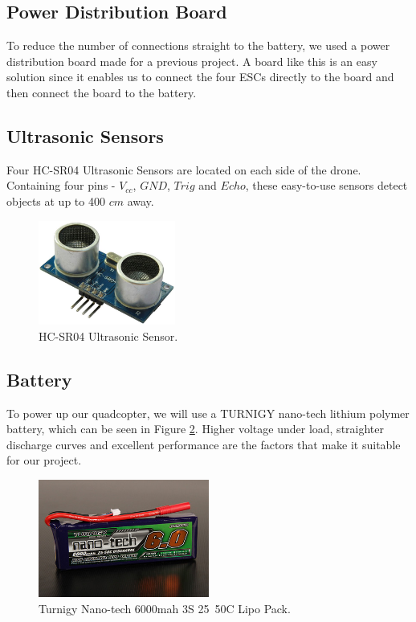 \subsection{Power Distribution Board}
To reduce the number of connections straight to the battery, we used a power distribution board made for a previous project. A board like this is an easy solution since it enables us to connect the four ESCs directly to the board and then connect the board to the battery.

\subsection{Ultrasonic Sensors}
Four HC-SR04 Ultrasonic Sensors are located on each side of the drone. Containing four pins - $V_{cc}$, $GND$, $Trig$ and $Echo$, these easy-to-use sensors detect objects at up to 400 $cm$ away.
\begin{figure}[H]
  \centering
    \includegraphics[width=0.4\textwidth]{images/HCSR04.jpg}
	\caption{HC-SR04 Ultrasonic Sensor.\cite{UltrasonicFig}}
	\label{HC}
\end{figure}

\subsection{Battery}
To power up our quadcopter, we will use a TURNIGY nano-tech lithium polymer battery, which can be seen in Figure \ref{battery}. Higher voltage under load, straighter discharge curves and excellent performance are the factors that make it suitable for our project. 

\begin{figure}[H]
  \centering
    \includegraphics[width=0.5\textwidth]{images/battery.jpg}
	\caption{Turnigy Nano-tech 6000mah 3S 25~50C Lipo Pack.\cite{batteryFig}}
	\label{battery}
\end{figure}

